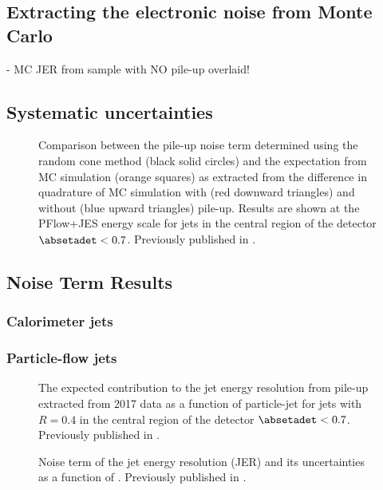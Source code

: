 \subsection{Extracting the electronic noise from Monte Carlo}
- MC JER from sample with NO pile-up overlaid!


\subsection{Systematic uncertainties}


\begin{figure}
    \caption{Comparison between the pile-up noise term \Npileup determined using the random cone method (black solid circles) and the expectation from MC simulation (orange squares) as extracted from the difference in quadrature of MC simulation with (red downward triangles) and without (blue upward triangles) pile-up. Results are shown at the PFlow+JES energy scale for jets in the central region of the detector $\absetadet < 0.7$. Previously published in .}
    \label{fig:non-closure}
\end{figure}


\subsection{Noise Term Results}
\subsubsection{Calorimeter jets}
\subsubsection{Particle-flow jets}

\begin{figure}
    \caption{The expected contribution to the jet energy resolution from pile-up extracted from 2017 data as a function of particle-jet \pT for \antikt jets with $R = 0.4$ in the central region of the detector $\absetadet < 0.7$. Previously published in .}
    \label{fig:pile-up-jer-vs-pt}
\end{figure}


\begin{figure}
    \caption{Noise term of the jet energy resolution (JER) and its uncertainties as a function of \abseta. Previously published in .}
    \label{fig:noise-term-results-pflow}
\end{figure}



